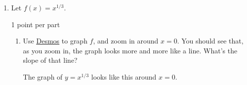\documentclass{article}
\makeatletter
\let\@href=\href
\renewcommand{\href}[2]{\@href{#1}{\ul{#2}}}
\makeatother
\begin{document}
\begin{enumerate}
\begin{enumerate}
    \begin{solution}
      First we use algebra to rewrite $f(x)$ as $\frac{1}{8}x^{-1} + \frac{7}{8}x^{-3}$.
      Then we can use the derivative rules we've learned: 
      $f'(x) = \frac{1}{8}(-x^{-2}) + 
      \frac{7}{8}(-3x^{-4}) =$ 
    \end{solution}

  \item
    \begin{problem}[\vfill]
      $f(x) = \dfrac{1}{\sqrt[4]{16x^3}} + \sqrt[5]{\pi} + \dfrac{1}{17}$
    \end{problem}

    \begin{solution}
      First we use algebra to rewrite $f(x)$ as $\frac{1}{2}x^{-3/4} + \sqrt[5]{\pi} + \tfrac{1}{17}$. Remember that $\sqrt[5]{\pi}$ and $\tfrac{1}{17}$ are constants, not
      variables. Using derivative rules, we find that $f'(x) = \frac{1}{2}(-\frac{3}{4}
      x^{-7/4})=$ 
    \end{solution}

  \end{enumerate}

\item  Let $f(x) = x^{1/3}$.

  \begin{grading}
    1 point per part
  \end{grading}

  \begin{enumerate}
  \item

    \begin{problem}[\vfill]
      Use \href{https://www.desmos.com/calculator}{Desmos} to graph $f$, and zoom in around $x = 0$. You should see that, as you zoom in, the graph looks more and more like a line. What's the slope of that line?
    \end{problem}

    \begin{solution}
      The graph of $y=x^{1/3}$ looks like this around $x=0$.



\end{solution}
\end{enumerate}
\end{enumerate}
\end{document}

